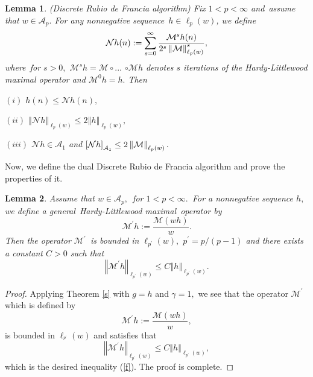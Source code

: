 \documentclass[a4paper]{amsart}
\theoremstyle{plain}
\newtheorem{lemma}{Lemma}[section]
\numberwithin{equation}{section}
\begin{document}
\begin{lemma}
\label{L}(Discrete Rubio de Francia algorithm) Fix $1<p<\infty $ and\ assume
that $w\in \mathcal{A}_{p}.$ For any nonnegative sequence\ $h\in \ell
_{p}(w) $, we define 
\begin{equation*}
\mathcal{N}h(n):=\sum_{s=0}^{\infty }\frac{\mathcal{M}^{s}h(n)}{%
2^{s}\left\Vert \mathcal{M}\right\Vert _{\ell _{p}(w)}^{s}},
\end{equation*}%
where\ for $s>0,$ $\mathcal{M}^{s}h=\mathcal{M\circ }...$ $\mathcal{\circ M}%
h $ denotes $s$ iterations of the Hardy-Littlewood maximal operator and $%
\mathcal{M}^{0}h=h.$ Then

$(i)$ $h(n)\leq \mathcal{N}h(n),$

$(ii)$ $\left\Vert \mathcal{N}h\right\Vert _{\ell _{p}(w)}\leq 2\left\Vert
h\right\Vert _{\ell _{p}(w)},$

$(iii)$ $\mathcal{N}h\in \mathcal{A}_{1}$ and $\left[ \mathcal{N}h\right] _{%
\mathcal{A}_{1}}\leq 2\left\Vert \mathcal{M}\right\Vert _{\ell _{p}(w)}.$
\end{lemma}

Now, we define the dual Discrete Rubio de Francia algorithm and prove the
properties of it.

\begin{lemma}
\label{s1}Assume that $w\in \mathcal{A}_{p},$\ for $1<p<\infty .$\ For a
nonnegative sequence $h,$ we define a general\ Hardy-Littlewood maximal\
operator by 
\begin{equation*}
\mathcal{M}^{\prime }h:=\frac{\mathcal{M}\left( wh\right) }{w}.
\end{equation*}%
Then the operator $\mathcal{M}^{\prime }$\ is bounded in $\ell _{p^{\prime
}}(w),$ $p^{\prime }=p/\left( p-1\right) $ and there exists a constant $C>0$
such that%
\begin{equation}
\left\Vert \mathcal{M}^{\prime }h\right\Vert _{\ell _{p^{\prime }}(w)}\leq
C\left\Vert h\right\Vert _{\ell _{p^{\prime }}(w)}.  \label{f}
\end{equation}
\end{lemma}

\begin{proof}
Applying Theorem \ref{s} with $g=h$ and $\gamma =1,$ we see that the
operator $\mathcal{M}^{\prime }$ which is defined by 
\begin{equation*}
\mathcal{M}^{\prime }h:=\frac{\mathcal{M}\left( wh\right) }{w},
\end{equation*}%
is bounded in $\ell _{^{p^{\prime }}}(w)$ and satisfies that%
\begin{equation*}
\left\Vert \mathcal{M}^{\prime }h\right\Vert _{\ell _{p^{\prime }}(w)}\leq
C\left\Vert h\right\Vert _{\ell _{p^{\prime }}(w)},
\end{equation*}%
which is the desired inequality (\ref{f}). The proof is complete.
\end{proof}
\end{document}
